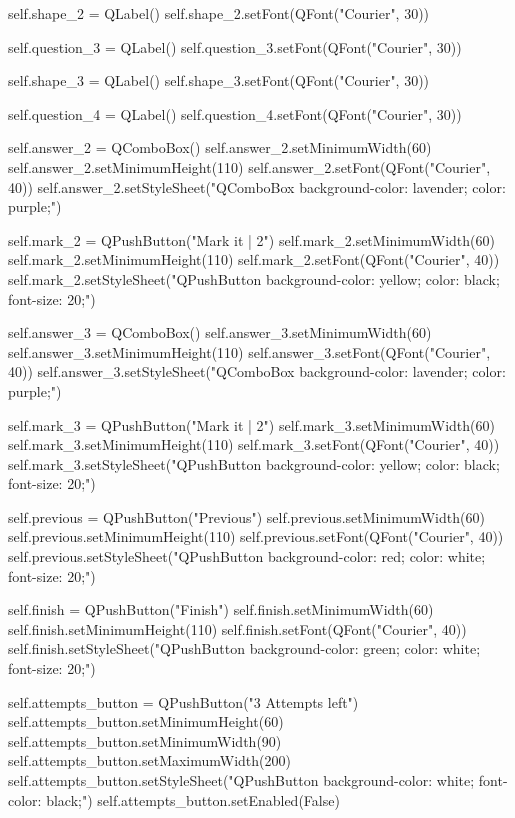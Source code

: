 \begin{python}
        self.shape_2 = QLabel()        
        self.shape_2.setFont(QFont("Courier", 30))
        
        self.question_3 = QLabel()        
        self.question_3.setFont(QFont("Courier", 30))
        
        self.shape_3 = QLabel()       
        self.shape_3.setFont(QFont("Courier", 30))
        
        self.question_4 = QLabel()       
        self.question_4.setFont(QFont("Courier", 30))

        self.answer_2 = QComboBox()
        self.answer_2.setMinimumWidth(60)
        self.answer_2.setMinimumHeight(110)
        self.answer_2.setFont(QFont("Courier", 40))
        self.answer_2.setStyleSheet("QComboBox {background-color: lavender; color: purple;}")

        self.mark_2 = QPushButton("Mark it  |  2")
        self.mark_2.setMinimumWidth(60)
        self.mark_2.setMinimumHeight(110)
        self.mark_2.setFont(QFont("Courier", 40))
        self.mark_2.setStyleSheet("QPushButton {background-color: yellow; color: black; font-size: 20;}")
        
        self.answer_3 = QComboBox()
        self.answer_3.setMinimumWidth(60)
        self.answer_3.setMinimumHeight(110)
        self.answer_3.setFont(QFont("Courier", 40))
        self.answer_3.setStyleSheet("QComboBox {background-color: lavender; color: purple;}")
        
        self.mark_3 = QPushButton("Mark it  |  2")
        self.mark_3.setMinimumWidth(60)
        self.mark_3.setMinimumHeight(110)
        self.mark_3.setFont(QFont("Courier", 40))
        self.mark_3.setStyleSheet("QPushButton {background-color: yellow; color: black; font-size: 20;}")

        self.previous = QPushButton("Previous")
        self.previous.setMinimumWidth(60)
        self.previous.setMinimumHeight(110)
        self.previous.setFont(QFont("Courier", 40))
        self.previous.setStyleSheet("QPushButton {background-color: red; color: white; font-size: 20;}")

        self.finish = QPushButton("Finish")
        self.finish.setMinimumWidth(60)
        self.finish.setMinimumHeight(110)
        self.finish.setFont(QFont("Courier", 40))
        self.finish.setStyleSheet("QPushButton {background-color: green; color: white; font-size: 20;}")

        self.attempts_button = QPushButton("3 Attempts left")
        self.attempts_button.setMinimumHeight(60)
        self.attempts_button.setMinimumWidth(90)
        self.attempts_button.setMaximumWidth(200)
        self.attempts_button.setStyleSheet("QPushButton {background-color: white; font-color: black;}")
        self.attempts_button.setEnabled(False)


\end{python}
